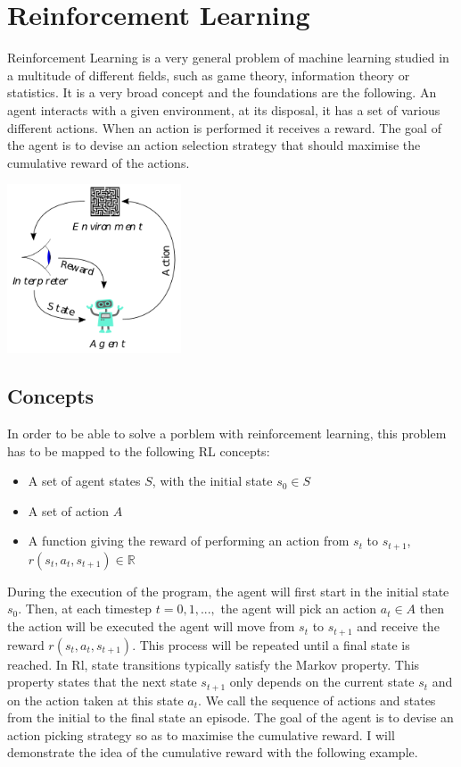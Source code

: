 
\setcounter{chapter}{1}

\chapter{Reinforcement Learning}
Reinforcement Learning is a very general problem of machine learning studied in a multitude of different fields, such as game theory, information theory or statistics. It is a very broad concept and the foundations are the following. An agent interacts with a given environment, at its disposal, it has a set of various different actions. When an action is performed it receives a reward. The goal of the agent is to devise an action selection strategy that should maximise the cumulative reward of the actions.

\begin{center}
	\includegraphics*[height=5cm]{figures/rl_broad.png}
\end{center}

\section{Concepts}
In order to be able to solve a porblem with reinforcement learning, this problem has to be mapped to the following RL concepts:
\begin{itemize}
	\item A set of agent states $S$, with the initial state $s_0\in S$
	\item A set of action $A$
	\item A function giving the reward of performing an action from  $s_t$ to $s_{t+1}$, $r(s_t,a_t,s_{t+1})\in \mathbb{R}$
\end{itemize}
During the execution of the program, the agent will first start in the initial state $s_0$. Then, at each timestep $t=0,1,...,$ the agent will pick an action $a_t \in A$ then the action will be executed the agent will move from $s_t$ to $s_{t+1}$ and receive the reward $r(s_t,a_t,s_{t+1})$. This process will be repeated until a final state is reached. In Rl, state transitions typically satisfy the Markov property. This property states that the next state $s_{t+1}$ only depends on the current state $s_t$ and on the action taken at this state $a_t$. We call the sequence of actions and states from the initial to the final state an episode. The goal of the agent is to devise an action picking strategy so as to maximise the cumulative reward. I will demonstrate the idea of the cumulative reward with the following example.
